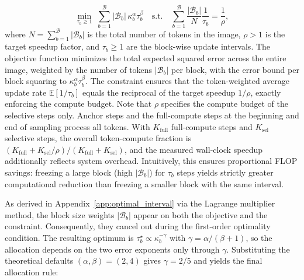 \begin{equation}
\min_{\tau_b \ge 1} \; \sum_{b=1}^{\mathcal{B}} |\mathcal{B}_b| \, \kappa_b^\alpha \tau_b^\beta
\quad \text{s.t.} \quad
\sum_{b=1}^{\mathcal{B}} \frac{|\mathcal{B}_b|}{N} \frac{1}{\tau_b} = \frac{1}{\rho},
\end{equation}
where $N = \sum_{b=1}^{\mathcal{B}} |\mathcal{B}_b|$ is the total number of tokens in the image, $\rho > 1$ is the target speedup factor, and $\tau_b \ge 1$ are the block-wise update intervals. The objective function minimizes the total expected squared error across the entire image, weighted by the number of tokens $|\mathcal{B}_b|$ per block, with the error bound per block squaring to $\kappa_b^\alpha \tau_b^\beta$. The constraint ensures that the token-weighted average update rate $\mathbb{E}[1/\tau_b]$ equals the reciprocal of the target speedup $1/\rho$, exactly enforcing the compute budget.
Note that $\rho$ specifies the compute budget of the selective steps only. Anchor steps and the full-compute steps at the beginning and end of sampling process all tokens. With $K_{\mathrm{full}}$ full-compute steps and $K_{\mathrm{sel}}$ selective steps, the overall token-compute fraction is $(K_{\mathrm{full}} + K_{\mathrm{sel}}/\rho)/(K_{\mathrm{full}} + K_{\mathrm{sel}})$, and the measured wall-clock speedup additionally reflects system overhead.
Intuitively, this ensures proportional FLOP savings: freezing a large block (high $|\mathcal{B}_b|$) for $\tau_b$ steps yields strictly greater computational reduction than freezing a smaller block with the same interval.

As derived in Appendix~\ref{app:optimal_interval} via the Lagrange multiplier method, the block size weights $|\mathcal{B}_b|$ appear on both the objective and the constraint. Consequently, they cancel out during the first-order optimality condition. The resulting optimum is $\tau_b^\star \propto \kappa_b^{-\gamma}$ with $\gamma=\alpha/(\beta+1)$, so the allocation depends on the two error exponents only through $\gamma$. Substituting the theoretical defaults $(\alpha,\beta)=(2,4)$ gives $\gamma=2/5$ and yields the final allocation rule:

